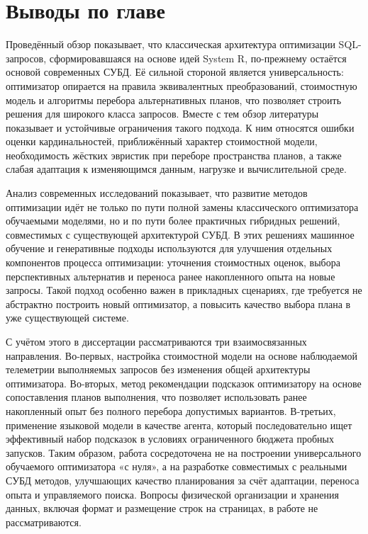 \section{Выводы по главе}

Проведённый обзор показывает, что классическая архитектура оптимизации SQL-запросов, сформировавшаяся на основе идей System R, по-прежнему остаётся основой современных СУБД. Её сильной стороной является универсальность: оптимизатор опирается на правила эквивалентных преобразований, стоимостную модель и алгоритмы перебора альтернативных планов, что позволяет строить решения для широкого класса запросов. Вместе с тем обзор литературы показывает и устойчивые ограничения такого подхода. К ним относятся ошибки оценки кардинальностей, приближённый характер стоимостной модели, необходимость жёстких эвристик при переборе пространства планов, а также слабая адаптация к изменяющимся данным, нагрузке и вычислительной среде.

Анализ современных исследований показывает, что развитие методов оптимизации идёт не только по пути полной замены классического оптимизатора обучаемыми моделями, но и по пути более практичных гибридных решений, совместимых с существующей архитектурой СУБД. В этих решениях машинное обучение и генеративные подходы используются для улучшения отдельных компонентов процесса оптимизации: уточнения стоимостных оценок, выбора перспективных альтернатив и переноса ранее накопленного опыта на новые запросы. Такой подход особенно важен в прикладных сценариях, где требуется не абстрактно построить новый оптимизатор, а повысить качество выбора плана в уже существующей системе.

С учётом этого в диссертации рассматриваются три взаимосвязанных направления. Во-первых, настройка стоимостной модели на основе наблюдаемой телеметрии выполняемых запросов без изменения общей архитектуры оптимизатора. Во-вторых, метод рекомендации подсказок оптимизатору на основе сопоставления планов выполнения, что позволяет использовать ранее накопленный опыт без полного перебора допустимых вариантов. В-третьих, применение языковой модели в качестве агента, который последовательно ищет эффективный набор подсказок в условиях ограниченного бюджета пробных запусков. Таким образом, работа сосредоточена не на построении универсального обучаемого оптимизатора «с нуля», а на разработке совместимых с реальными СУБД методов, улучшающих качество планирования за счёт адаптации, переноса опыта и управляемого поиска. Вопросы физической организации и хранения данных, включая формат и размещение строк на страницах, в работе не рассматриваются.

